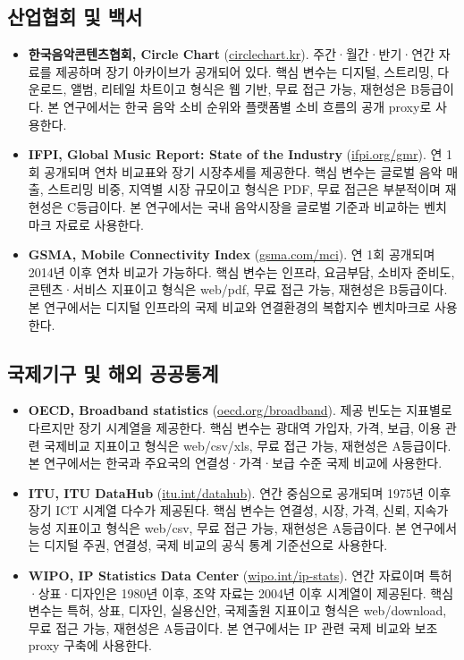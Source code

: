 \documentclass[11pt,a4paper]{report}
\begin{document}
\subsection{산업협회 및 백서}
\begin{itemize}[leftmargin=*, itemsep=0.6em]
  \item \textbf{한국음악콘텐츠협회, Circle Chart} (\href{https://circlechart.kr/}{circlechart.kr}). 주간·월간·반기·연간 자료를 제공하며 장기 아카이브가 공개되어 있다. 핵심 변수는 디지털, 스트리밍, 다운로드, 앨범, 리테일 차트이고 형식은 웹 기반, 무료 접근 가능, 재현성은 B등급이다. 본 연구에서는 한국 음악 소비 순위와 플랫폼별 소비 흐름의 공개 proxy로 사용한다.
  \item \textbf{IFPI, Global Music Report: State of the Industry} (\href{https://www.ifpi.org/ifpi-global-music-report-global-recorded-music-revenues-grew-10-2-in-2023/}{ifpi.org/gmr}). 연 1회 공개되며 연차 비교표와 장기 시장추세를 제공한다. 핵심 변수는 글로벌 음악 매출, 스트리밍 비중, 지역별 시장 규모이고 형식은 PDF, 무료 접근은 부분적이며 재현성은 C등급이다. 본 연구에서는 국내 음악시장을 글로벌 기준과 비교하는 벤치마크 자료로 사용한다.
  \item \textbf{GSMA, Mobile Connectivity Index} (\href{https://www.gsma.com/solutions-and-impact/connectivity-for-good/mobile-for-development/gsma_resources/mobile-connectivity-index-methodology-2/}{gsma.com/mci}). 연 1회 공개되며 2014년 이후 연차 비교가 가능하다. 핵심 변수는 인프라, 요금부담, 소비자 준비도, 콘텐츠·서비스 지표이고 형식은 web/pdf, 무료 접근 가능, 재현성은 B등급이다. 본 연구에서는 디지털 인프라의 국제 비교와 연결환경의 복합지수 벤치마크로 사용한다.
\end{itemize}

\subsection{국제기구 및 해외 공공통계}
\begin{itemize}[leftmargin=*, itemsep=0.6em]
  \item \textbf{OECD, Broadband statistics} (\href{https://www.oecd.org/en/topics/broadband-statistics.html}{oecd.org/broadband}). 제공 빈도는 지표별로 다르지만 장기 시계열을 제공한다. 핵심 변수는 광대역 가입자, 가격, 보급, 이용 관련 국제비교 지표이고 형식은 web/csv/xls, 무료 접근 가능, 재현성은 A등급이다. 본 연구에서는 한국과 주요국의 연결성·가격·보급 수준 국제 비교에 사용한다.
  \item \textbf{ITU, ITU DataHub} (\href{https://datahub.itu.int/}{itu.int/datahub}). 연간 중심으로 공개되며 1975년 이후 장기 ICT 시계열 다수가 제공된다. 핵심 변수는 연결성, 시장, 가격, 신뢰, 지속가능성 지표이고 형식은 web/csv, 무료 접근 가능, 재현성은 A등급이다. 본 연구에서는 디지털 주권, 연결성, 국제 비교의 공식 통계 기준선으로 사용한다.
  \item \textbf{WIPO, IP Statistics Data Center} (\href{https://www.wipo.int/en/web/ip-statistics/about}{wipo.int/ip-stats}). 연간 자료이며 특허·상표·디자인은 1980년 이후, 조약 자료는 2004년 이후 시계열이 제공된다. 핵심 변수는 특허, 상표, 디자인, 실용신안, 국제출원 지표이고 형식은 web/download, 무료 접근 가능, 재현성은 A등급이다. 본 연구에서는 IP 관련 국제 비교와 보조 proxy 구축에 사용한다.
\end{itemize}
\end{document}
